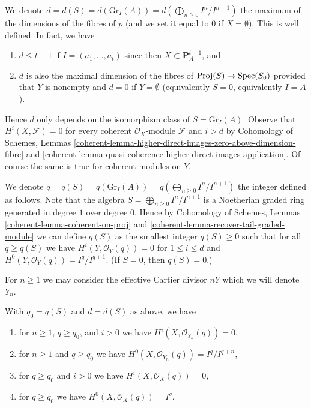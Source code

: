 \medskip\noindent
We denote
$d = d(S) = d(\text{Gr}_I(A)) = d(\bigoplus_{n \geq 0} I^n/I^{n + 1})$
the maximum of the dimensions of the fibres of $p$
(and we set it equal to $0$ if $X = \emptyset$).
This is well defined. In fact, we have
\begin{enumerate}
\item $d \leq t - 1$ if $I = (a_1, \ldots, a_t)$ since then
$X \subset \mathbf{P}^{t - 1}_A$, and
\item $d$ is also the maximal dimension of the fibres of
$\text{Proj}(S) \to \mathop{\mathrm{Spec}}(S_0)$ provided that $Y$
is nonempty and $d = 0$ if $Y = \emptyset$
(equivalently $S = 0$, equivalently $I = A$).
\end{enumerate}
Hence $d$ only depends on the isomorphism class of $S = \text{Gr}_I(A)$.
Observe that $H^i(X, \mathcal{F}) = 0$ for every coherent
$\mathcal{O}_X$-module $\mathcal{F}$ and $i > d$ by
Cohomology of Schemes, Lemmas
\ref{coherent-lemma-higher-direct-images-zero-above-dimension-fibre} and
\ref{coherent-lemma-quasi-coherence-higher-direct-images-application}.
Of course the same is true for coherent modules on $Y$.

\medskip\noindent
We denote
$q = q(S) = q(\text{Gr}_I(A)) = q(\bigoplus_{n \geq 0} I^n/I^{n + 1})$
the integer defined as follows. Note that the algebra
$S = \bigoplus_{n \geq 0} I^n/I^{n + 1}$
is a Noetherian graded ring generated in degree $1$ over degree $0$.
Hence by
Cohomology of Schemes, Lemmas \ref{coherent-lemma-coherent-on-proj} and
\ref{coherent-lemma-recover-tail-graded-module} we can define $q(S)$
as the smallest integer $q(S) \geq 0$ such that for all $q \geq q(S)$ we have
$H^i(Y, \mathcal{O}_Y(q)) = 0$ for $1 \leq i \leq d$ and
$H^0(Y, \mathcal{O}_Y(q)) = I^q/I^{q + 1}$.
(If $S = 0$, then $q(S) = 0$.)

\medskip\noindent
For $n \geq 1$ we may consider the effective Cartier divisor $nY$
which we will denote $Y_n$.

\begin{lemma}
\label{lemma-bound-q-and-d}
With $q_0 = q(S)$ and $d = d(S)$ as above, we have
\begin{enumerate}
\item for $n \geq 1$, $q \geq q_0$, and $i > 0$ we have
$H^i(X, \mathcal{O}_{Y_n}(q)) = 0$,
\item for $n \geq 1$ and $q \geq q_0$ we have
$H^0(X, \mathcal{O}_{Y_n}(q)) = I^q/I^{q + n}$,
\item for $q \geq q_0$ and $i > 0$ we have
$H^i(X, \mathcal{O}_X(q)) = 0$,
\item for $q \geq q_0$ we have
$H^0(X, \mathcal{O}_X(q)) = I^q$.
\end{enumerate}
\end{lemma}

